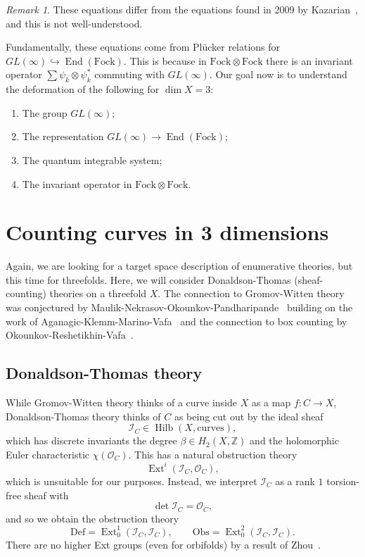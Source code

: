 \documentclass[leqno, openany]{memoir}
\theoremstyle{definition}
\theoremstyle{remark}
\newtheorem{rmk}[thm]{Remark}
\theoremstyle{plain}
\theoremstyle{definition}
\theoremstyle{remark}
\newcommand{\Z}{\mathbb{Z}}
\newcommand{\mc}[1]{\mathcal{#1}}
\newcommand{\mr}[1]{\mathrm{#1}}
\DeclareMathOperator{\Ext}{Ext}
\DeclareMathOperator{\End}{End}
\DeclareMathOperator{\Hilb}{Hilb}
\begin{document}
\begin{rmk}
    These equations differ from the equations found in 2009 by Kazarian~\cite{kaz}, and this is not well-understood.
\end{rmk}

Fundamentally, these equations come from Pl\"ucker relations for $GL(\infty) \hookrightarrow \End(\mr{Fock})$. This is because in $\mr{Fock} \otimes \mr{Fock}$ there is an invariant operator $\sum \psi_k \otimes \psi_k^*$ commuting with $GL(\infty)$. Our goal now is to understand the deformation of the following for $\dim X = 3$:
\begin{enumerate}
    \item The group $GL(\infty)$;
    \item The representation $GL(\infty) \to \End(\mr{Fock})$;
    \item The quantum integrable system;
    \item The invariant operator in $\mr{Fock} \otimes \mr{Fock}$.
\end{enumerate}

\section{Counting curves in 3 dimensions}

Again, we are looking for a target space description of enumerative theories, but this time for threefolds. Here, we will consider Donaldson-Thomas (sheaf-counting) theories on a threefold $X$. The connection to Gromov-Witten theory was conjectured by Maulik-Nekrasov-Okounkov-Pandharipande~\cite{mnop1,mnop2} building on the work of Aganagic-Klemm-Marino-Vafa~\cite{vertexphys} and the connection to box counting by Okounkov-Reshetikhin-Vafa~\cite{crystals}.

\subsection{Donaldson-Thomas theory}

While Gromov-Witten theory thinks of a curve inside $X$ as a map $f \colon C \to X$, Donaldson-Thomas theory thinks of $C$ as being cut out by the ideal sheaf
\[ \mc{I}_C \in \Hilb(X, \mr{curves}), \]
which has discrete invariants the degree $\beta \in H_2(X, \Z)$ and the holomorphic Euler characteristic $\chi(\mc{O}_C)$. This has a natural obstruction theory
\[ \Ext^i(\mc{I}_C, \mc{O}_C), \]
which is unsuitable for our purposes. Instead, we interpret $\mc{I}_C$ as a rank $1$ torsion-free sheaf with 
\[ \det \mc{I}_C = \mc{O}_C, \]
and so we obtain the obstruction theory
\[ \mr{Def} = \Ext_0^1(\mc{I}_C, \mc{I}_C), \qquad \mr{Obs} = \Ext_0^2(\mc{I}_C, \mc{I}_C). \]
There are no higher Ext groups (even for orbifolds) by a result of Zhou~\cite{relorbdt}.
\end{document}
